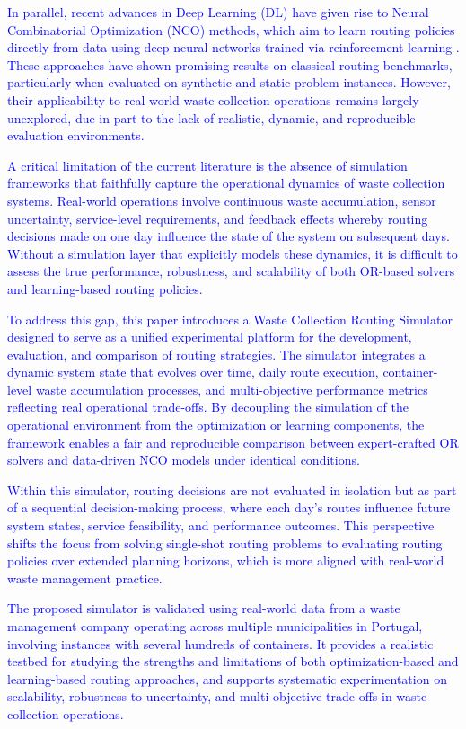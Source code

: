 \documentclass[orivec,runningheads]{llncs}
\begin{document}
\begin{center}
\begin{longtable}
\textcolor{blue}{In parallel, recent advances in Deep Learning (DL) have given rise to Neural Combinatorial Optimization (NCO) methods, which aim to learn routing policies directly from data using deep neural networks trained via reinforcement learning \cite{wu2024neural}. These approaches have shown promising results on classical routing benchmarks, particularly when evaluated on synthetic and static problem instances. However, their applicability to real-world waste collection operations remains largely unexplored, due in part to the lack of realistic, dynamic, and reproducible evaluation environments.}


\textcolor{blue}{A critical limitation of the current literature is the absence of simulation frameworks that faithfully capture the operational dynamics of waste collection systems. Real-world operations involve continuous waste accumulation, sensor uncertainty, service-level requirements, and feedback effects whereby routing decisions made on one day influence the state of the system on subsequent days. Without a simulation layer that explicitly models these dynamics, it is difficult to assess the true performance, robustness, and scalability of both OR-based solvers and learning-based routing policies.}


\textcolor{blue}{To address this gap, this paper introduces a Waste Collection Routing Simulator designed to serve as a unified experimental platform for the development, evaluation, and comparison of routing strategies. The simulator integrates a dynamic system state that evolves over time, daily route execution, container-level waste accumulation processes, and multi-objective performance metrics reflecting real operational trade-offs. By decoupling the simulation of the operational environment from the optimization or learning components, the framework enables a fair and reproducible comparison between expert-crafted OR solvers and data-driven NCO models under identical conditions.}

\textcolor{blue}{Within this simulator, routing decisions are not evaluated in isolation but as part of a sequential decision-making process, where each day's routes influence future system states, service feasibility, and performance outcomes. This perspective shifts the focus from solving single-shot routing problems to evaluating routing policies over extended planning horizons, which is more aligned with real-world waste management practice.}

\textcolor{blue}{The proposed simulator is validated using real-world data from a waste management company operating across multiple municipalities in Portugal, involving instances with several hundreds of containers. It provides a realistic testbed for studying the strengths and limitations of both optimization-based and learning-based routing approaches, and supports systematic experimentation on scalability, robustness to uncertainty, and multi-objective trade-offs in waste collection operations.}


\end{longtable}
\end{center}
\end{document}
